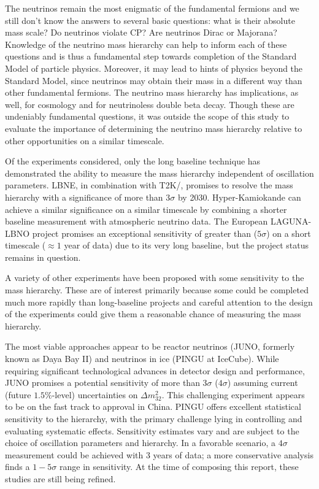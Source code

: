 The neutrinos remain the most enigmatic of the fundamental fermions and we still don't know the answers to several basic questions:  what is their absolute mass scale?  Do neutrinos violate CP?  Are neutrinos Dirac or Majorana?  
Knowledge of the neutrino mass hierarchy can help to inform each of these questions and is thus a fundamental step towards completion of the Standard Model of particle physics.
Moreover, it may lead to hints of physics beyond the Standard Model, since neutrinos may obtain their mass in a different way than other fundamental fermions.  The neutrino mass hierarchy has implications, as well,  for cosmology and for neutrinoless double beta decay.  
Though these are undeniably fundamental questions, it was outside the scope of this study to evaluate the importance of determining the neutrino mass hierarchy relative to other opportunities on a similar timescale.


Of the experiments considered, only the long baseline technique has demonstrated the ability to measure the mass hierarchy independent of oscillation parameters.  LBNE, in combination with T2K/\NOvA, promises to resolve the mass hierarchy with a significance of more than $3\sigma$ by 2030.   Hyper-Kamiokande can achieve a similar significance on a similar timescale by combining a shorter baseline measurement with atmospheric neutrino data.  The European LAGUNA-LBNO project promises an exceptional sensitivity of greater than ($5\sigma$) on a short timescale ($\approx 1$ year of data) due to its very long baseline, but the project status remains in question.

A variety of other experiments have been proposed with some sensitivity to the mass hierarchy. 
These are of interest primarily because some could be completed much more rapidly than long-baseline projects and careful attention to the design of the experiments could give them a reasonable chance of measuring the mass hierarchy.  

The most viable approaches appear to be reactor neutrinos (JUNO, formerly known as Daya Bay II) and  neutrinos in ice (PINGU at IceCube).  While requiring significant technological advances in detector design and performance, JUNO promises a potential sensitivity of more than  $3\sigma$ ($4\sigma$) assuming current (future $1.5\%$-level) uncertainties on $\Delta m^2_{32}$.  This challenging experiment appears to be on the fast track to approval in China.  PINGU offers excellent statistical sensitivity to the hierarchy, with the primary challenge lying in controlling and evaluating systematic effects.  Sensitivity estimates vary 
and are subject to the choice of oscillation parameters and hierarchy.  In a favorable scenario, a $4\sigma$ measurement could be achieved with 3 years of data; a more conservative analysis finds a $1-5\sigma$ range in sensitivity.
At the time of composing this report, these studies are still being refined.   

